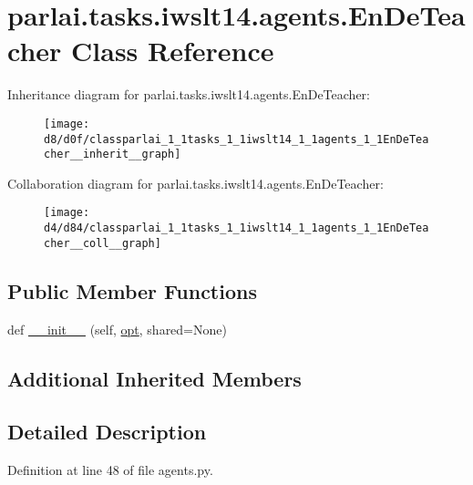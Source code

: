 \hypertarget{classparlai_1_1tasks_1_1iwslt14_1_1agents_1_1EnDeTeacher}{}\section{parlai.\+tasks.\+iwslt14.\+agents.\+En\+De\+Teacher Class Reference}
\label{classparlai_1_1tasks_1_1iwslt14_1_1agents_1_1EnDeTeacher}


Inheritance diagram for parlai.\+tasks.\+iwslt14.\+agents.\+En\+De\+Teacher\+:
\nopagebreak
\begin{figure}[H]
\begin{center}
\leavevmode
\texttt{[image: d8/d0f/classparlai\_1\_1tasks\_1\_1iwslt14\_1\_1agents\_1\_1EnDeTeacher\_\_inherit\_\_graph]}
\end{center}
\end{figure}


Collaboration diagram for parlai.\+tasks.\+iwslt14.\+agents.\+En\+De\+Teacher\+:
\nopagebreak
\begin{figure}[H]
\begin{center}
\leavevmode
\texttt{[image: d4/d84/classparlai\_1\_1tasks\_1\_1iwslt14\_1\_1agents\_1\_1EnDeTeacher\_\_coll\_\_graph]}
\end{center}
\end{figure}
\subsection*{Public Member Functions}
\begin{DoxyCompactItemize}
\item 
def \hyperlink{classparlai_1_1tasks_1_1iwslt14_1_1agents_1_1EnDeTeacher_a1f914b4b0d6966897f2addccd6001acc}{\+\_\+\+\_\+init\+\_\+\+\_\+} (self, \hyperlink{classparlai_1_1core_1_1agents_1_1Teacher_a3ce6243860ce978a897922863ed32fa4}{opt}, shared=None)
\end{DoxyCompactItemize}
\subsection*{Additional Inherited Members}


\subsection{Detailed Description}


Definition at line 48 of file agents.\+py.



